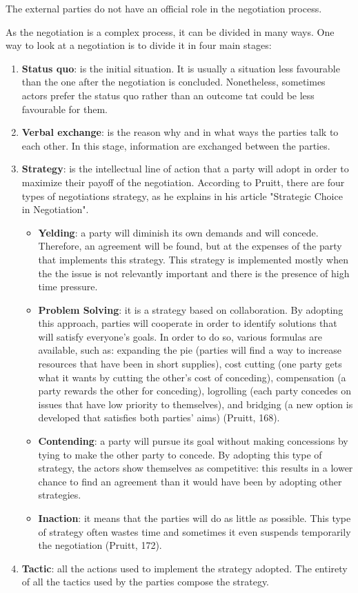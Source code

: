 \documentclass[../main.tex]{subfiles}
\begin{document}
The external parties do not have an official role in the negotiation process. %

As the negotiation is a complex process, it can be divided in many ways. One way to look at a negotiation is to divide it in four main stages:
\begin{enumerate}
\item \textbf{Status quo}: is the initial situation. It is usually a situation less favourable than the one after the negotiation is concluded. Nonetheless, sometimes actors prefer the status quo rather than an outcome tat could be less favourable for them.
\item \textbf{Verbal exchange}: is the reason why and in what ways the parties talk to each other. In this stage, information are exchanged between the parties.
\item \textbf{Strategy}: is the intellectual line of action that a party will adopt in order to maximize their payoff of the negotiation. According to Pruitt, there are four types of negotiations strategy, as he explains in his article "Strategic Choice in Negotiation"\cite{Pruitt}.
\begin{itemize}
\item \textbf{Yelding}: a party will diminish its own demands and will concede. Therefore, an agreement will be found, but at the expenses of the party that implements this strategy. This strategy is implemented mostly when the the issue is not relevantly important and there is the presence of high time pressure.
\item \textbf{Problem Solving}: it is a strategy based on collaboration. By adopting this approach, parties will cooperate in order to identify solutions that will satisfy everyone's goals. In order to do so, various formulas are available, such as: expanding the pie (parties will find a way to increase resources that have been in short supplies), cost cutting (one party gets what it wants by cutting the other's cost of conceding), compensation (a party rewards the other for conceding), logrolling (each party concedes on issues that have low priority to themselves), and bridging (a new option is developed that satisfies both parties' aims) (Pruitt, 168).
\item \textbf{Contending}: a party will pursue its goal without making concessions by tying to make the other party to concede. By adopting this type of strategy, the actors show themselves as competitive: this results in a lower chance to find an agreement than it would have been by adopting other strategies.
\item \textbf{Inaction}: it means that the parties will do as little as possible. This type of strategy often wastes time and sometimes it even suspends temporarily the negotiation (Pruitt, 172).
\end{itemize}
\item \textbf{Tactic}: all the actions used to implement the strategy adopted. The entirety of all the tactics used by the parties compose the strategy.
\end{enumerate}
\end{document}
